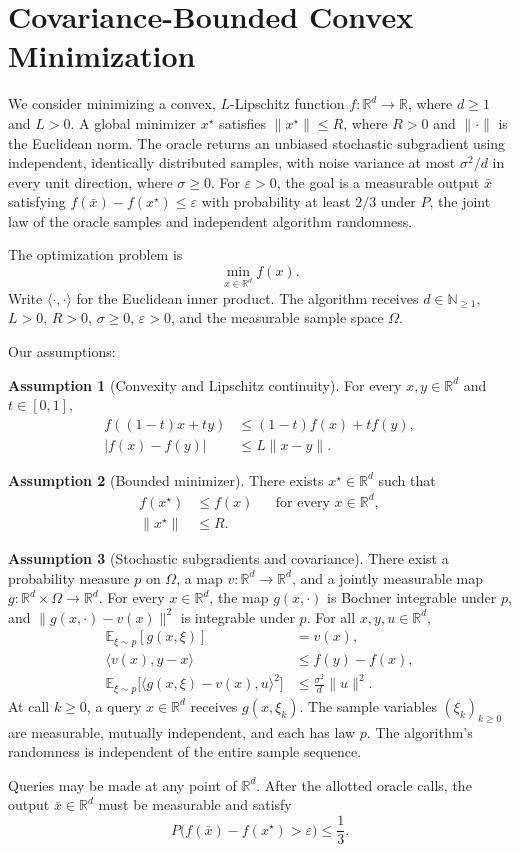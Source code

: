 \documentclass[10pt]{article}
\theoremstyle{definition}
\newtheorem{assumption}{Assumption}
\begin{document}
\section*{Covariance-Bounded Convex Minimization}
We consider minimizing a convex, $L$-Lipschitz function $f:\mathbb{R}^d\to\mathbb{R}$, where $d\geq1$ and $L>0$. A global minimizer $x^\star$ satisfies $\|x^\star\|\leq R$, where $R>0$ and $\|\cdot\|$ is the Euclidean norm. The oracle returns an unbiased stochastic subgradient using independent, identically distributed samples, with noise variance at most $\sigma^2/d$ in every unit direction, where $\sigma\geq0$. For $\varepsilon>0$, the goal is a measurable output $\bar{x}$ satisfying $f(\bar{x})-f(x^\star)\leq\varepsilon$ with probability at least $2/3$ under $P$, the joint law of the oracle samples and independent algorithm randomness.

The optimization problem is
\[
\min_{x\in\mathbb{R}^d} f(x).
\]
Write $\langle\cdot,\cdot\rangle$ for the Euclidean inner product. The algorithm receives $d\in\mathbb{N}_{\geq1}$, $L>0$, $R>0$, $\sigma\geq0$, $\varepsilon>0$, and the measurable sample space $\Omega$.

Our assumptions:
\begin{assumption}[Convexity and Lipschitz continuity]
For every $x,y\in\mathbb{R}^d$ and $t\in[0,1]$,
\[
\begin{aligned}
f((1-t)x+ty)&\leq(1-t)f(x)+tf(y),\\
|f(x)-f(y)|&\leq L\|x-y\|.
\end{aligned}
\]
\end{assumption}

\begin{assumption}[Bounded minimizer]
There exists $x^\star\in\mathbb{R}^d$ such that
\[
\begin{aligned}
f(x^\star)&\leq f(x) &&\text{for every }x\in\mathbb{R}^d,\\
\|x^\star\|&\leq R.
\end{aligned}
\]
\end{assumption}

\begin{assumption}[Stochastic subgradients and covariance]
There exist a probability measure $p$ on $\Omega$, a map $v:\mathbb{R}^d\to\mathbb{R}^d$, and a jointly measurable map $g:\mathbb{R}^d\times\Omega\to\mathbb{R}^d$. For every $x\in\mathbb{R}^d$, the map $g(x,\cdot)$ is Bochner integrable under $p$, and $\|g(x,\cdot)-v(x)\|^2$ is integrable under $p$. For all $x,y,u\in\mathbb{R}^d$,
\[
\begin{aligned}
\mathbb{E}_{\xi\sim p}[g(x,\xi)]&=v(x),\\
\langle v(x),y-x\rangle&\leq f(y)-f(x),\\
\mathbb{E}_{\xi\sim p}\big[\langle g(x,\xi)-v(x),u\rangle^2\big]
&\leq \frac{\sigma^2}{d}\|u\|^2.
\end{aligned}
\]
At call $k\geq0$, a query $x\in\mathbb{R}^d$ receives $g(x,\xi_k)$. The sample variables $(\xi_k)_{k\geq0}$ are measurable, mutually independent, and each has law $p$. The algorithm's randomness is independent of the entire sample sequence.
\end{assumption}

Queries may be made at any point of $\mathbb{R}^d$. After the allotted oracle calls, the output $\bar{x}\in\mathbb{R}^d$ must be measurable and satisfy
\[
P\bigl(f(\bar{x})-f(x^\star)>\varepsilon\bigr)\leq\frac13.
\]
\end{document}
